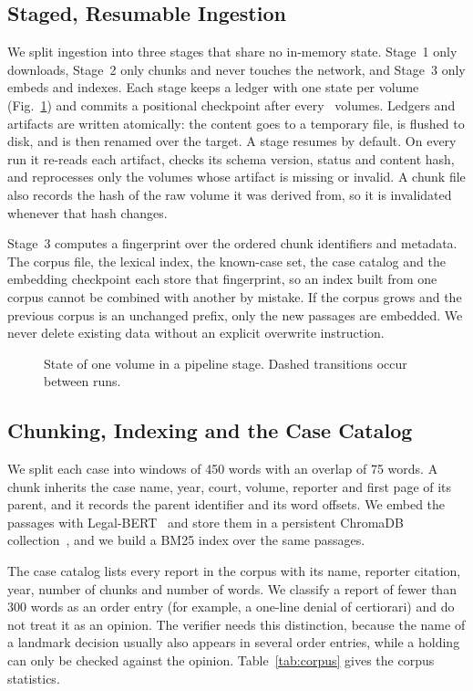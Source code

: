\documentclass[conference]{IEEEtran}
\begin{document}
\subsection{Staged, Resumable Ingestion}
We split ingestion into three stages that share no in-memory state. Stage~1 only downloads, Stage~2 only chunks and never touches the network, and Stage~3 only embeds and indexes. Each stage keeps a ledger with one state per volume (Fig.~\ref{fig:pipeline}) and commits a positional checkpoint after every \ResCorpusCheckpointInterval\ volumes. Ledgers and artifacts are written atomically: the content goes to a temporary file, is flushed to disk, and is then renamed over the target. A stage resumes by default. On every run it re-reads each artifact, checks its schema version, status and content hash, and reprocesses only the volumes whose artifact is missing or invalid. A chunk file also records the hash of the raw volume it was derived from, so it is invalidated whenever that hash changes.

Stage~3 computes a fingerprint over the ordered chunk identifiers and metadata. The corpus file, the lexical index, the known-case set, the case catalog and the embedding checkpoint each store that fingerprint, so an index built from one corpus cannot be combined with another by mistake. If the corpus grows and the previous corpus is an unchanged prefix, only the new passages are embedded. We never delete existing data without an explicit overwrite instruction.

\begin{figure}[t]
\centering

\caption{State of one volume in a pipeline stage. Dashed transitions occur between runs.}\label{fig:pipeline}
\end{figure}

\subsection{Chunking, Indexing and the Case Catalog}
We split each case into windows of 450 words with an overlap of 75 words. A chunk inherits the case name, year, court, volume, reporter and first page of its parent, and it records the parent identifier and its word offsets. We embed the passages with Legal-BERT~\cite{legalbert} and store them in a persistent ChromaDB collection~\cite{chroma}, and we build a BM25 index over the same passages.

The case catalog lists every report in the corpus with its name, reporter citation, year, number of chunks and number of words. We classify a report of fewer than 300 words as an order entry (for example, a one-line denial of certiorari) and do not treat it as an opinion. The verifier needs this distinction, because the name of a landmark decision usually also appears in several order entries, while a holding can only be checked against the opinion. Table~\ref{tab:corpus} gives the corpus statistics.
\end{document}
